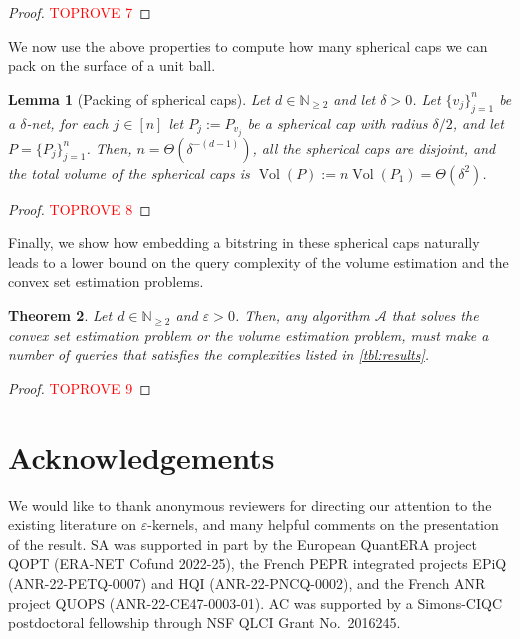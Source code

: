 \documentclass[11pt]{article}
\newtheorem{theorem}{Theorem}[section]
\newtheorem{lemma}[theorem]{Lemma}
\newcommand{\A}{\ensuremath{\mathcal{A}}}
\newcommand{\N}{\ensuremath{\mathbb{N}}}
\DeclareMathOperator{\Vol}{Vol}
\begin{document}
    \begin{proof}\textcolor{red}{TOPROVE 7}\end{proof}

    We now use the above properties to compute how many spherical caps we can pack on the surface of a unit ball.

    \begin{lemma}[Packing of spherical caps]
        \label{lem:spherical-cap-packing}
        Let $d \in \N_{\geq2}$ and let $\delta > 0$. Let $\{v_j\}_{j=1}^n$ be a $\delta$-net, for each $j \in [n]$ let $P_j := P_{v_j}$ be a spherical cap with radius $\delta/2$, and let $P = \{P_j\}_{j=1}^n$. Then, $n = \Theta(\delta^{-(d-1)})$, all the spherical caps are disjoint, and the total volume of the spherical caps is $\Vol(P) := n\Vol(P_1) = \Theta(\delta^2)$.
    \end{lemma}

    \begin{proof}\textcolor{red}{TOPROVE 8}\end{proof}

    Finally, we show how embedding a bitstring in these spherical caps naturally leads to a lower bound on the query complexity of the volume estimation and the convex set estimation problems.

    \begin{theorem}
        \label{thm:lbs}
        Let $d \in \N_{\geq 2}$ and $\varepsilon > 0$. Then, any algorithm $\A$ that solves the convex set estimation problem or the volume estimation problem, must make a number of queries that satisfies the complexities listed in \cref{tbl:results}.
    \end{theorem}

    \begin{proof}\textcolor{red}{TOPROVE 9}\end{proof}

    \section*{Acknowledgements}

    We would like to thank anonymous reviewers for directing our attention to the existing literature on $\varepsilon$-kernels, and many helpful comments on the presentation of the result.
    SA was supported in part by the European QuantERA project QOPT (ERA-NET Cofund 2022-25), the French PEPR integrated projects EPiQ (ANR-22-PETQ-0007) and HQI (ANR-22-PNCQ-0002), and the French ANR project QUOPS (ANR-22-CE47-0003-01).
    AC was supported by a Simons-CIQC postdoctoral fellowship through NSF QLCI Grant No.\ 2016245.
\end{document}
